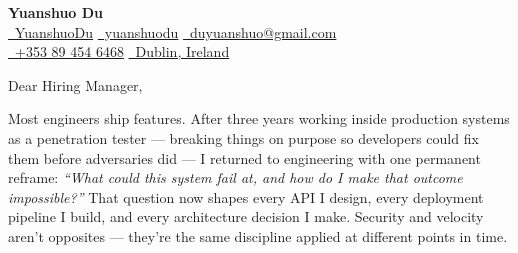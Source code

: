 \documentclass{coverletter}
\begin{document}
\begin{center}
  {\Large\sffamily\bfseries\color{namecolor} Yuanshuo Du}\\[0.12cm]
  {\sffamily\small
    \href{https://github.com/YuanshuoDu}{\color{accent}\faGithub\color{muted}\ YuanshuoDu}
    \quad\textbullet\quad
    \href{https://linkedin.com/in/yuanshuodu}{\color{accent}\faLinkedin\color{muted}\ yuanshuodu}
    \quad\textbullet\quad
    \href{https://mail.google.com/mail/?view=cm&to=duyuanshuo@gmail.com}{\color{accent}\faEnvelope\color{muted}\ duyuanshuo@gmail.com}
  }\\[0.06cm]
  {\sffamily\small\color{muted}
    \href{tel:+353894546468}{\color{accent}\faPhone\color{muted}\ +353 89 454 6468}
    \quad\textbullet\quad
    \href{https://www.google.com/maps/place/Dublin,+Ireland}{\color{accent}\faMapMarker\color{muted}\ Dublin, Ireland}
  }
\end{center}

\clrule

\noindent%
{\color{secondary}\sffamily\small
  Dear Hiring Manager,
}

\vspace{0.25cm}

\noindent%
{\color{secondary}\sffamily\small
  Most engineers ship features. After three years working inside production systems
  as a penetration tester — breaking things on purpose so developers could fix them
  before adversaries did — I returned to engineering with one permanent reframe:
  \textit{``What could this system fail at, and how do I make that outcome impossible?''}
  That question now shapes every API I design, every deployment pipeline I build,
  and every architecture decision I make. Security and velocity aren't opposites —
  they're the same discipline applied at different points in time.
}

\vspace{0.3cm}
\end{document}

